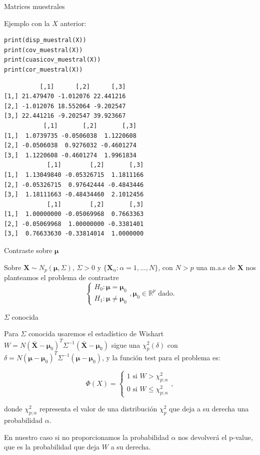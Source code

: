 \documentclass[xcolor=table]{beamer}
\begin{document}
\begin{frame}[fragile]{Matrices muestrales}

Ejemplo con la $X$ anterior:

\begin{lstlisting}
print(disp_muestral(X))
print(cov_muestral(X))
print(cuasicov_muestral(X))
print(cor_muestral(X))
\end{lstlisting}

\begin{lstlisting}
          [,1]      [,2]      [,3]
[1,] 21.479470 -1.012076 22.441216
[2,] -1.012076 18.552064 -9.202547
[3,] 22.441216 -9.202547 39.923667
           [,1]       [,2]       [,3]
[1,]  1.0739735 -0.0506038  1.1220608
[2,] -0.0506038  0.9276032 -0.4601274
[3,]  1.1220608 -0.4601274  1.9961834
            [,1]        [,2]       [,3]
[1,]  1.13049840 -0.05326715  1.1811166
[2,] -0.05326715  0.97642444 -0.4843446
[3,]  1.18111663 -0.48434460  2.1012456
            [,1]        [,2]       [,3]
[1,]  1.00000000 -0.05069968  0.7663363
[2,] -0.05069968  1.00000000 -0.3381401
[3,]  0.76633630 -0.33814014  1.0000000
\end{lstlisting}
\end{frame}

\begin{frame}[fragile]{Contraste sobre $\pmb{\mu}$}

Sobre $\pmb{X} \sim N_p(\pmb{\mu}, \Sigma)$, $\Sigma>0$ y $\{\pmb{X}_{\alpha} : \alpha = 1, \ldots, N\}$, con $N > p$ una m.a.s de $\pmb{X}$ nos planteamos el problema de contrastre $$\begin{cases} H_0 : \pmb{\mu} = \pmb{\mu}_0 \\ H_1: \pmb{\mu} \neq \pmb{\mu}_0 \end{cases}, \pmb{\mu}_0 \in \mathbb{R}^p \text{ dado.} $$
\end{frame}


\begin{frame}[fragile]{$\Sigma$ conocida}

Para $\Sigma$ conocida usaremos el estadístico de Wishart $W = N (\pmb{\bar{X}} - \pmb{\mu}_0)^T \Sigma^{-1} (\pmb{\bar{X}} - \pmb{\mu}_0) $ sigue una $\chi^2_p(\delta)$ con $\delta = N (\pmb{\mu} - \pmb{\mu}_0)^T \Sigma^{-1} (\pmb{\mu} - \pmb{\mu}_0)$, y la función test para el problema es:

$$ \Phi(X) = \begin{cases} 1 \text{ si } W > \chi^2_{p;\alpha} \\ 0 \text{ si } W \leq \chi^2_{p;\alpha} \end{cases}, $$

donde $\chi^2_{p;\alpha}$ representa el valor de una distribución $\chi^2_p$ que deja a su derecha una probabilidad $\alpha$.

En nuestro caso si no proporcionamos la probabilidad $\alpha$ nos devolverá el p-value, que es la probabilidad que deja $W$ a su derecha.

\end{frame}
\end{document}
